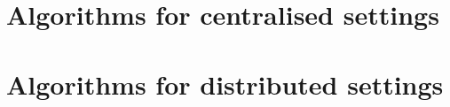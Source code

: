 \documentclass[10pt,journal,compsoc]{IEEEtran}
\begin{document}

%


\appendices
\section{Algorithms for centralised settings}


\section{Algorithms for distributed settings}
\end{document}
